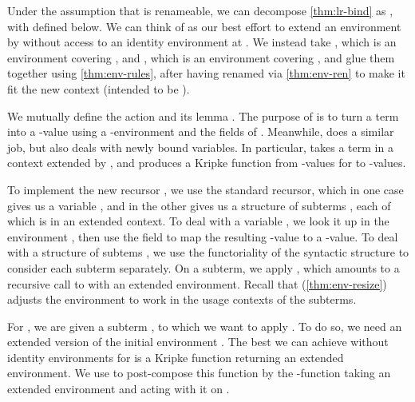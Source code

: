 Under the assumption that \AgdaBound{$\V$} is renameable, we can decompose
\cref{thm:lr-bind} as
\AgdaSpace{}\AgdaOperator{\AgdaFunction{$\circ$}}%
\AgdaSpace{}, with  defined below.
We can think of  as our best effort to extend an
environment by \AgdaBound{$\Theta$} without access to an identity environment
at \AgdaBound{$\Theta$}.
We instead take \AgdaBound{$\rho$}, which is an environment covering
\AgdaBound{$\Delta$}, and \AgdaBound{$\sigma$}, which is an environment
covering \AgdaBound{$\Theta$}, and glue them together using
\cref{thm:env-rules}, after having renamed \AgdaBound{$\rho$} via
\cref{thm:env-ren} to make it fit the new context \AgdaBound{$\Gamma^+$}
(intended to be ).


We mutually define the action  and its lemma
.
The purpose of  is to turn a term into a
\AgdaBound{$\C$}-value using a \AgdaBound{$\V$}-environment and the fields of
.
Meanwhile,  does a similar job, but also deals with
newly bound variables.
In particular,  takes a term in a context extended by
\AgdaBound{$\Theta$}, and produces a Kripke function from
\AgdaBound{$\V$}-values for \AgdaBound{$\Theta$} to \AgdaBound{$\C$}-values.


To implement the new recursor , we use the standard
recursor, which in one case gives us a variable , and in the other
gives us a structure of subterms , each of which is in an extended
context.
To deal with a variable , we look it
up in the environment \AgdaBound{$\rho$}, then use the
 field to map the resulting
\AgdaBound{$\V$}-value to a \AgdaBound{$\C$}-value.
To deal with a structure of subtems , we use the functoriality of
the syntactic structure to consider each subterm separately.
On a subterm, we apply , which amounts to a recursive call
to  with an extended environment.
Recall that  (\cref{thm:env-resize}) adjusts the
environment \AgdaBound{$\rho$} to work in the usage contexts of the subterms.


For , we are given a subterm , to which we
want to apply .
To do so, we need an extended version of the initial environment
\AgdaBound{$\rho$}.
The best we can achieve without identity environments for \AgdaBound{$\V$} is
a Kripke function returning an extended environment.
We use  to post-compose this function by the
\AgdaSymbol{$\lambda$}-function taking an extended environment and acting with
it on .

